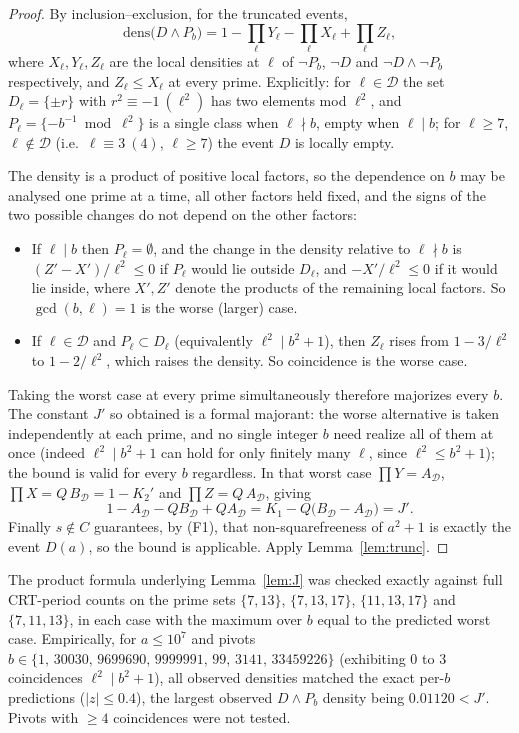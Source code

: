 \documentclass[11pt,a4paper]{article}
\theoremstyle{plain}
\theoremstyle{definition}
\theoremstyle{remark}
\newcommand{\Dset}{\mathcal{D}}
\begin{document}
\begin{proof}
By inclusion--exclusion, for the truncated events,
\[
 \mathrm{dens}\bigl(D\wedge P_b\bigr)=1-\prod_\ell Y_\ell-\prod_\ell X_\ell+\prod_\ell Z_\ell,
\]
where $X_\ell, Y_\ell, Z_\ell$ are the local densities at $\ell$ of $\neg P_b$, $\neg D$ and
$\neg D\wedge\neg P_b$ respectively, and $Z_\ell\le X_\ell$ at every prime. Explicitly: for
$\ell\in\Dset$ the set $D_\ell=\{\pm r\}$ with $r^2\equiv-1\ (\ell^2)$ has two elements mod $\ell^2$,
and $P_\ell=\{-b^{-1}\bmod \ell^2\}$ is a single class when $\ell\nmid b$, empty when $\ell\mid b$; for
$\ell\ge 7$, $\ell\notin\Dset$ (i.e.\ $\ell\equiv 3\ (4)$, $\ell\ge 7$) the event $D$ is locally empty.

The density is a product of positive local factors, so the dependence on $b$ may be analysed one prime
at a time, all other factors held fixed, and the signs of the two possible changes do not depend on the
other factors:
\begin{itemize}
\item If $\ell\mid b$ then $P_\ell=\emptyset$, and the change in the density relative to
$\ell\nmid b$ is $(Z'-X')/\ell^2\le 0$ if $P_\ell$ would lie outside $D_\ell$, and $-X'/\ell^2\le 0$ if
it would lie inside, where $X',Z'$ denote the products of the remaining local factors. So
$\gcd(b,\ell)=1$ is the worse (larger) case.
\item If $\ell\in\Dset$ and $P_\ell\subset D_\ell$ (equivalently $\ell^2\mid b^2+1$), then $Z_\ell$
rises from $1-3/\ell^{2}$ to $1-2/\ell^{2}$, which raises the density. So coincidence is the worse case.
\end{itemize}
Taking the worst case at every prime simultaneously therefore majorizes every $b$. The constant
$J'$ so obtained is a formal majorant: the worse alternative is taken independently at each prime,
and no single integer $b$ need realize all of them at once (indeed $\ell^2\mid b^2+1$ can hold for
only finitely many $\ell$, since $\ell^2\le b^2+1$); the bound is valid for every $b$ regardless.
In that worst case
$\prod Y=A_{\Dset}$, $\prod X=Q\,B_{\Dset}=1-K_2'$ and $\prod Z=Q\,A_{\Dset}$, giving
\[
 1-A_{\Dset}-Q B_{\Dset}+Q A_{\Dset}=K_1-Q\bigl(B_{\Dset}-A_{\Dset}\bigr)=J' .
\]
Finally $s\notin C$ guarantees, by (F1), that non-squarefreeness of $a^2+1$ is exactly the event $D(a)$,
so the bound is applicable. Apply Lemma~\ref{lem:trunc}.
\end{proof}

The product formula underlying Lemma~\ref{lem:J} was checked exactly against full CRT-period counts on
the prime sets $\{7,13\}$, $\{7,13,17\}$, $\{11,13,17\}$ and $\{7,11,13\}$, in each case with the
maximum over $b$ equal to the predicted worst case. Empirically, for $a\le 10^{7}$ and pivots
$b\in\{1,\,30030,\,9699690,\,9999991,\,99,\,3141,\,33459226\}$ (exhibiting $0$ to $3$ coincidences
$\ell^2\mid b^2+1$), all observed densities matched the exact per-$b$ predictions ($|z|\le 0.4$), the
largest observed $D\wedge P_b$ density being $0.01120<J'$. Pivots with $\ge 4$ coincidences were not
tested.
\end{document}
